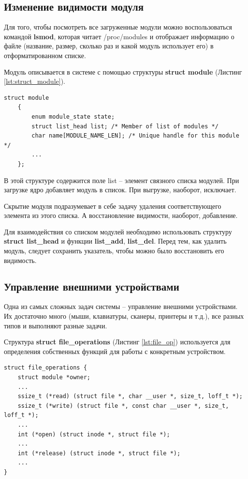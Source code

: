 \subsection{Изменение видимости модуля}
Для того, чтобы посмотреть все загруженные модули можно воспользоваться командой \textbf{lsmod}, которая читает /proc/modules и отображает информацию о файле (название, размер, сколько раз и какой модуль использует его) в отформатированном списке. \cite{lsmod}

Модуль описывается в системе с помощью структуры \textbf{struct module} (Листинг \ref{lst:struct_module}).
\begin{lstlisting}[caption = {struct module}, label=lst:struct_module]
	struct module
	{
		enum module_state state;
		struct list_head list; /* Member of list of modules */
		char name[MODULE_NAME_LEN]; /* Unique handle for this module */
		...
	};
\end{lstlisting}

В этой структуре содержится поле list -- элемент связного списка модулей. При загрузке ядро добавляет модуль в список. При выгрузке, наоборот, исключает. 

Скрытие модуля подразумевает в себе задачу удаления соответствующего элемента из этого списка. А восстановление видимости, наоборот, добавление.

Для взаимодействия со списком модулей необходимо использовать структуру \textbf{struct list\_head} и функции \textbf{list\_add}, \textbf{list\_del}. Перед тем, как удалить модуль, следует сохранить указатель, чтобы можно было восстановить его видимость. \cite{hide} \newline

\subsection{Управление внешними устройствами}
Одна из самых сложных задач системы -- управление внешними устройствами. Их достаточно много (мыши, клавиатуры, сканеры, принтеры и т.д.), все разных типов и выполняют разные задачи.  

Структура \textbf{struct file\_operations} (Листинг \ref{lst:file_op}) используется для определения собственных функций для работы с конкретным устройством. 
\begin{lstlisting}[caption = {struct file\_operations}, label=lst:file_op]
struct file_operations {
	struct module *owner;
	...
	ssize_t (*read) (struct file *, char __user *, size_t, loff_t *);
	ssize_t (*write) (struct file *, const char __user *, size_t, loff_t *);
	...
	int (*open) (struct inode *, struct file *);
	...
	int (*release) (struct inode *, struct file *);
	...
}
\end{lstlisting}

